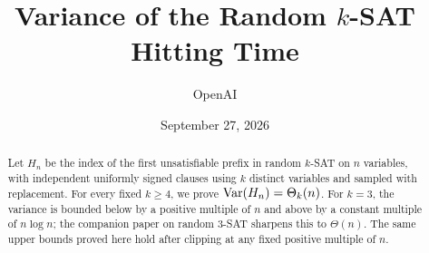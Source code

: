 \documentclass[11pt]{article}
\title{Variance of the Random \texorpdfstring{$k$}{k}-SAT Hitting Time}
\author{OpenAI}
\date{September 27, 2026}
\begin{document}
\maketitle
\begin{abstract}
Let $H_n$ be the index of the first unsatisfiable prefix in random $k$-SAT
on $n$ variables, with independent uniformly signed clauses using $k$
distinct variables and sampled with replacement. For every fixed $k\ge4$,
we prove $\operatorname{Var}(H_n)=\Theta_k(n)$. For $k=3$, the variance is bounded below
by a positive multiple of $n$ and above by a constant multiple of $n\log n$;
the companion paper on random 3-SAT sharpens this to $\Theta(n)$.
The same upper bounds proved here hold after clipping at any fixed positive
multiple of $n$.
\end{abstract}







\appendix





\end{document}
